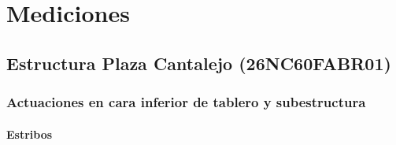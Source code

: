 \normalsize%
\doparttoc%
\part{Mediciones}%
\chapter{Estructura Plaza Cantalejo (26NC60FABR01)}%
\section{Actuaciones en cara inferior de tablero y subestructura}%
\subsection{Estribos}%
\tablefirsthead{}%
\tablehead{}%
%
\tablelasttail{}%
